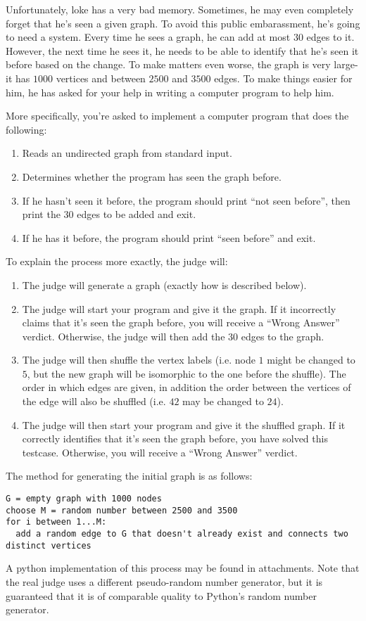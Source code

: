 \noindent
Unfortunately, loke has a very bad memory. Sometimes, he may even completely forget that he's seen a given graph. 
To avoid this public embarassment, he's going to need a system. Every time he sees a graph, he can add at most $30$
edges to it. However, the next time he sees it, he needs to be able to identify that he's seen it before based on the
change. To make matters even worse, the graph is very large- it has $1000$ vertices and between $2500$ and $3500$ edges.
To make things easier for him, he has asked for your help in writing a computer program to help him.

More specifically, you're asked to implement a computer program that does the following:
\begin{enumerate}
  \item Reads an undirected graph from standard input.
  \item Determines whether the program has seen the graph before.
  \item If he hasn't seen it before, the program should print ``not seen before'', then print the $30$ edges to be added and exit.
  \item If he has it before, the program should print ``seen before'' and exit.
\end{enumerate}
To explain the process more exactly, the judge will:
\begin{enumerate}
  \item The judge will generate a graph (exactly how is described below).
  \item The judge will start your program and give it the graph. If it incorrectly claims that it's seen the graph before,
  you will receive a ``Wrong Answer'' verdict. Otherwise, the judge will then add the $30$ edges to the graph.
  \item The judge will then shuffle the vertex labels (i.e. node $1$ might be changed to $5$, but the new
  graph will be isomorphic to the one before the shuffle). The order in which edges are given, in addition the
  order between the vertices of the edge will also be shuffled (i.e. $4 2$ may be changed to $2 4$).
  \item The judge will then start your program and give it the shuffled graph. If it correctly identifies that
  it's seen the graph before, you have solved this testcase. Otherwise, you will receive a ``Wrong Answer'' verdict.
\end{enumerate}

The method for generating the initial graph is as follows:
\begin{verbatim}
G = empty graph with 1000 nodes
choose M = random number between 2500 and 3500
for i between 1...M:
  add a random edge to G that doesn't already exist and connects two distinct vertices
\end{verbatim}
A python implementation of this process may be found in attachments. Note that the real judge uses a different pseudo-random
number generator, but it is guaranteed that it is of comparable quality to Python's random number generator.


